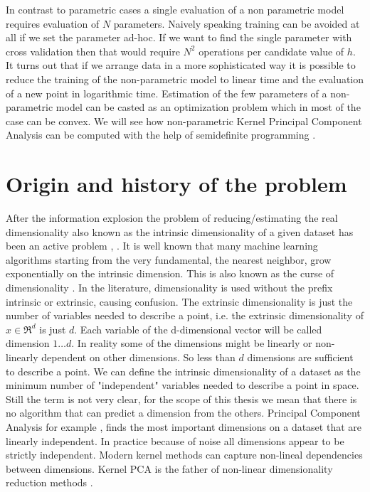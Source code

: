 \documentclass[12pt,letterpaper,doublespaced,ETD,dvips,proposal]{gtthesis}
\begin{document}
\begin{Body}

In contrast to parametric cases a single evaluation of a non
parametric model requires evaluation of $N$ parameters. Naively
speaking training can be avoided at all if we set the parameter
ad-hoc. If we want to find the single parameter with cross
validation then that would require $N^2$ operations per candidate
value of $h$. It turns out that if we arrange data in a more sophisticated way
it is possible to reduce the training of the non-parametric model to
linear time and the evaluation of a new point in logarithmic time.
Estimation of the few parameters of a non-parametric model can be
casted as an optimization problem which in most of the case can be
convex. We will see how non-parametric Kernel Principal Component
Analysis \cite{scholkopf1998nca} can be computed with the help
of semidefinite programming \cite{vandenberghe1996sp, boyd2004co}.

\section{Origin and history of the problem}
\label{origin}

After the information explosion the problem of reducing/estimating
the real dimensionality also known as the intrinsic dimensionality of a
given dataset has been an active problem \cite{kegl2003ide}, \cite{costa2003egm}.
It is well known that many
machine learning algorithms starting from the very fundamental, the
nearest neighbor, grow exponentially on the intrinsic dimension. This
is also known as the curse of dimensionality \cite{donoho2000hdd}.
In the literature, dimensionality is used without the prefix intrinsic or
extrinsic, causing confusion. The extrinsic dimensionality is just
the number of variables needed to describe a point, i.e. the
extrinsic dimensionality of $x\in \Re^d$ is just $d$. Each variable
of the d-dimensional vector will be called dimension $1\dots d$. In
reality some of the dimensions might be linearly or non-linearly
dependent on other dimensions. So less than $d$ dimensions are
sufficient to describe a point. We can define the intrinsic
dimensionality of a dataset as the minimum number of "independent"
variables needed to describe a point in space. Still the term is not
very clear, for the scope of this thesis we mean that there is no
algorithm that can predict a dimension from the others. Principal
Component Analysis for example \cite{jolliffe2002pca}, finds the most important dimensions
on a dataset that are linearly independent. In practice because of
noise all dimensions appear to be strictly independent.  Modern
kernel methods can capture non-lineal dependencies between
dimensions. Kernel PCA is the father of non-linear dimensionality
reduction methods \cite{scholkopf2002lks}.


\end{Body}
\end{document}
